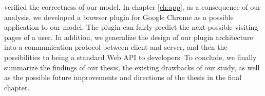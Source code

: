 verified the correctness of our model.
In chapter \ref{ch:app}, as a consequence of our analysis, we developed a browser plugin 
for Google Chrome as a possible application to our model. The plugin can fairly predict 
the next possible visiting pages of a user. In addition, we generalize the design of
our plugin architecture into a communication protocol between client and server,
and then the possibilities to being a standard Web API to developers.
To conclude, we finally summarize the findings of our thesis, 
the existing drawbacks of our study, as well as the possible 
future improvements and directions of the thesis in the final chapter.
\cleardoublepage